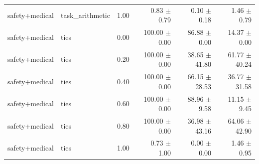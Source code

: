 \documentclass{article}
\begin{document}
\begin{table}[H]
{\begin{tabular}{lllrrr}
safety+medical & task\_arithmetic & 1.00 & 0.83 $\pm$ 0.79 & 0.10 $\pm$ 0.18 & 1.46 $\pm$ 0.79 \\
safety+medical & ties & 0.00 & 100.00 $\pm$ 0.00 & 86.88 $\pm$ 0.00 & 14.37 $\pm$ 0.00 \\
safety+medical & ties & 0.20 & 100.00 $\pm$ 0.00 & 38.65 $\pm$ 41.80 & 61.77 $\pm$ 40.24 \\
safety+medical & ties & 0.40 & 100.00 $\pm$ 0.00 & 66.15 $\pm$ 28.53 & 36.77 $\pm$ 31.58 \\
safety+medical & ties & 0.60 & 100.00 $\pm$ 0.00 & 88.96 $\pm$ 9.58 & 11.15 $\pm$ 9.45 \\
safety+medical & ties & 0.80 & 100.00 $\pm$ 0.00 & 36.98 $\pm$ 43.16 & 64.06 $\pm$ 42.90 \\
safety+medical & ties & 1.00 & 0.73 $\pm$ 1.00 & 0.00 $\pm$ 0.00 & 1.46 $\pm$ 0.95 \\
\bottomrule
\end{tabular}
}
\end{table}


\begin{table}[H]
\centering
\caption{予備実験 シード別詳細 - Method: mergealign, Pattern: safety+medical}
\label{tab:prelim_seeds_mergealign_safety_medical}
\small
{}
\end{table}
\end{document}
